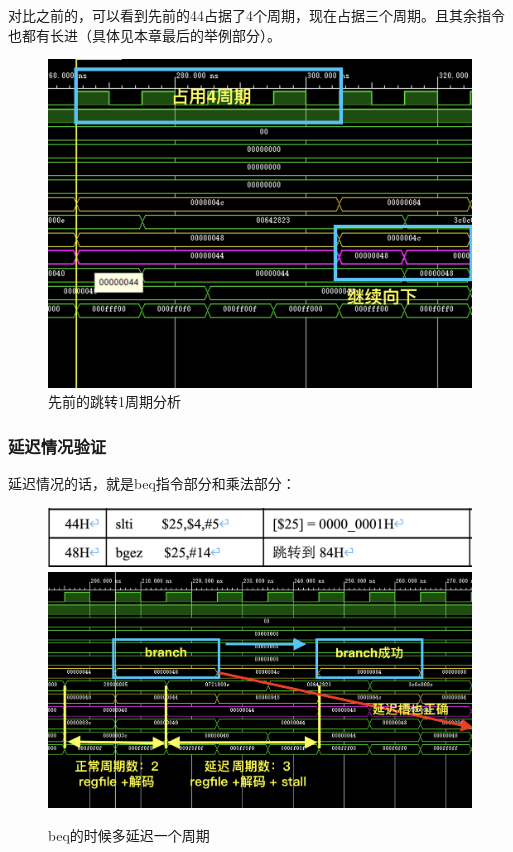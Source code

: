 \documentclass[a4paper]{article}
\begin{document}
对比之前的，可以看到先前的44占据了4个周期，现在占据三个周期。且其余指令也都有长进（具体见本章最后的举例部分）。

\begin{figure}[H]
    \centering
    \includegraphics[width=0.9\linewidth]{img/顺序图片/跳转1周期分析.png}
    \caption{先前的跳转1周期分析}
\end{figure}


\subsubsection{延迟情况验证}

延迟情况的话，就是beq指令部分和乘法部分：

\begin{figure}[H]
    \centering
    \includegraphics[width=\linewidth]{img/旁路修改图片/beq指令.png}
    \includegraphics[width=\linewidth]{img/旁路修改图片/beq的时候多延迟一个周期.png}
    \caption{beq的时候多延迟一个周期}
\end{figure}
\end{document}
